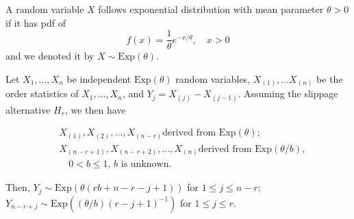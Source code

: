 \documentclass{report}
\begin{document}
 \begin{defn}
     A random variable $X$ follows exponential distribution with mean parameter $\theta > 0$ if it has pdf of
     \[ 
         f(x) = \frac{1}{\theta} e^{-x/\theta}, \quad x >0
     \]
     and we denoted it by $X \sim \mathrm{Exp}(\theta)$.
 \end{defn}


 \begin{lem} \label{Lemma: order statistic transformation}
     Let $X_1, \ldots, X_{n}$ be independent $\mathrm{Exp}(\theta)$ random variables, 
      $X_{(1)},\ldots X_{(n)}$ be the order statistics of $X_1,\ldots,X_n$, and $Y_j = X_{(j)} - X_{(j-1)}$. Assuming the
      slippage alternative $H_r$, we then have
 
 \begin{align*}
     &X_{(1)},X_{(2)},\ldots,X_{(n-r)} \text{derived from $\mathrm{Exp}(\theta)$};
     \\
      & X_{(n-r+1)},X_{(n-r+2)},\ldots,X_{(n)} \text{derived from $\mathrm{Exp}(\theta/b)$,} \\
     &\quad \text{$0 < b \leqslant 1$, $b$ is unknown.}
 \end{align*}
      
      Then, $Y_j \sim \mathrm{Exp}(\theta(rb + n-r-j+1))$ for $ 1 \leqslant j \leqslant n-r$; 
      $Y_{n-r+j} \sim \mathrm{Exp}((\theta/b)(r-j+1)^{-1})$ for $ 1 \leqslant j \leqslant r$.
 \end{lem}
 
\end{document}
